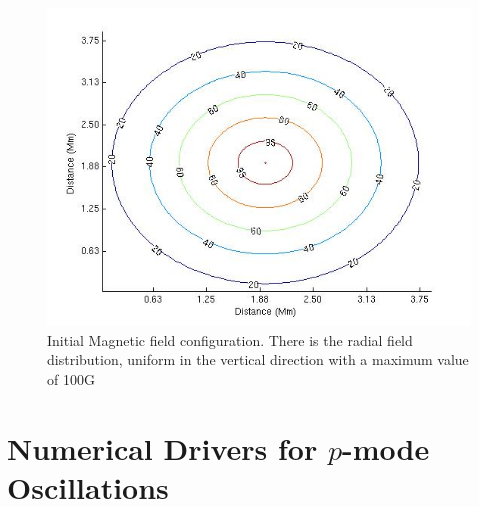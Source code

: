\documentclass{aastex62}
\begin{document}
\begin{figure}[h]\label{inimagfieldplot}
\includegraphics[scale=0.7]{imrescale/bfield100G.jpg}
\caption{Initial Magnetic field configuration. There is the radial field distribution, uniform in the vertical direction with a maximum value of 100G }
\end{figure}


\section{Numerical Drivers for $p$-mode Oscillations}
\end{document}
